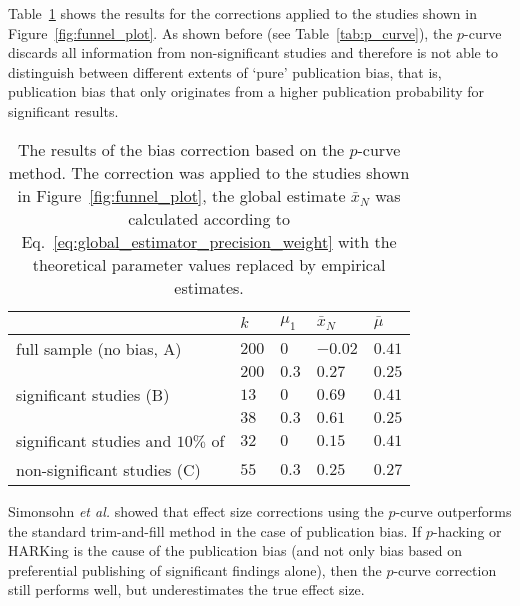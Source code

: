 Table~\ref{tab:p_curve_correction} shows the results for the corrections applied to the studies shown in Figure~\ref{fig:funnel_plot}. As shown before (see Table~\ref{tab:p_curve}), the $p$-curve discards all information from non-significant studies and therefore is not able to distinguish between different extents of `pure' publication bias, that is, publication bias that only originates from a higher publication probability for significant results. 
\begin{table}[h!]
  \begin{center}
    \begin{tabular}{ >{\raggedright\let\\\tabularnewline}p{} | >{\raggedleft\let\\\tabularnewline}p{}| >{\raggedleft\let\\\tabularnewline}p{} | >{\raggedleft\let\\\tabularnewline}p{} | >{\raggedleft\let\\\tabularnewline}p{}} 
        \hline
         & $k$\TBstrut & $\mu_1$ & $\bar{x}_N$ & $\bar{\mu}$ \\ 
        \hline
        full sample (no bias, A)\Tstrut & $200$ & $0$ & $-0.02$  & $0.41$ \\ 
        & $200$\Bstrut & $0.3$ & $0.27$  & $0.25$\\
        \hline
        significant studies (B)\Tstrut& $13$ & $0$ & $0.69$ & $0.41$ \\
        & $38$\Bstrut & $0.3$ & $0.61$ & $0.25$ \\
        \hline
        significant studies and $10\%$ of\Tstrut & $32$ & $0$ & $0.15$ & $0.41$ \\
        non-significant studies (C) & $55$\Bstrut & $0.3$ & $0.25$ & $0.27$ \\
     \hline
    \end{tabular}
    \caption[Using the $p$-curve to correct for publication bias.]{The results of the bias correction based on the $p$-curve method. The correction was applied to the studies shown in Figure~\ref{fig:funnel_plot}, the global estimate $\bar{x}_N$ was calculated according to Eq.~\ref{eq:global_estimator_precision_weight} with the theoretical parameter values replaced by empirical estimates.}
    \label{tab:p_curve_correction}
  \end{center}
\end{table}
Simonsohn \textit{et al.} showed that effect size corrections using the $p$-curve outperforms the standard trim-and-fill method in the case of publication bias. If $p$-hacking or HARKing is the cause of the publication bias (and not only bias based on preferential publishing of significant findings alone), then the $p$-curve correction still performs well, but underestimates the true effect size.

